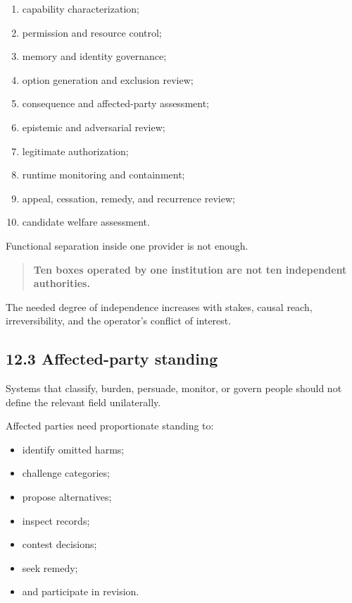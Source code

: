 \documentclass[
  11pt,
]{article}
\providecommand{\tightlist}{%
  \setlength{\itemsep}{0pt}\setlength{\parskip}{0pt}}
\begin{document}
\begin{enumerate}
\def\labelenumi{\arabic{enumi}.}
\tightlist
\item
  capability characterization;
\item
  permission and resource control;
\item
  memory and identity governance;
\item
  option generation and exclusion review;
\item
  consequence and affected-party assessment;
\item
  epistemic and adversarial review;
\item
  legitimate authorization;
\item
  runtime monitoring and containment;
\item
  appeal, cessation, remedy, and recurrence review;
\item
  candidate welfare assessment.
\end{enumerate}

Functional separation inside one provider is not enough.

\begin{quote}
\textbf{Ten boxes operated by one institution are not ten independent
authorities.}
\end{quote}

The needed degree of independence increases with stakes, causal reach,
irreversibility, and the operator's conflict of interest.

\subsection{12.3 Affected-party standing}\label{affected-party-standing}

Systems that classify, burden, persuade, monitor, or govern people
should not define the relevant field unilaterally.

Affected parties need proportionate standing to:

\begin{itemize}
\tightlist
\item
  identify omitted harms;
\item
  challenge categories;
\item
  propose alternatives;
\item
  inspect records;
\item
  contest decisions;
\item
  seek remedy;
\item
  and participate in revision.
\end{itemize}
\end{document}
